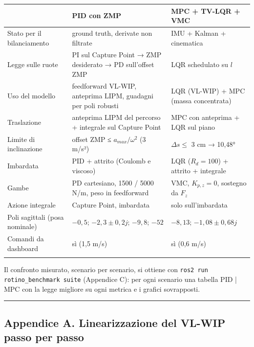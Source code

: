 \documentclass[
]{article}
\begin{document}
\begin{longtable}[]{@{}>{\raggedright\arraybackslash}p{}>{\raggedright\arraybackslash}p{}>{\raggedright\arraybackslash}p{}@{}}
\toprule\noalign{}
 & PID con ZMP & MPC + TV-LQR + VMC \\
\midrule\noalign{}
\endhead
Stato per il bilanciamento & ground truth, derivate non filtrate & IMU + Kalman + cinematica \\
Legge sulle ruote & PI sul Capture Point → ZMP desiderato → PD sull'offset ZMP & LQR schedulato su \(l\) \\
Uso del modello & feedforward VL-WIP, anteprima LIPM, guadagni per poli robusti & LQR (VL-WIP) + MPC (massa concentrata) \\
Traslazione & anteprima LIPM del percorso + integrale sul Capture Point & MPC con anteprima + LQR sul piano \\
Limite di inclinazione & offset ZMP ≤ \(a_{max}/\omega^2\) (3 m/s²) & \(\Delta s\le\) 3 cm → 10,48° \\
Imbardata & PID + attrito (Coulomb e viscoso) & LQR (\(R_d = 100\)) + attrito + integrale \\
Gambe & PD cartesiano, 1500 / 5000 N/m, peso in feedforward & VMC, \(K_{p,z} = 0\), sostegno da \(F_z\) \\
Azione integrale & Capture Point, imbardata & solo sull'imbardata \\
Poli sagittali (posa nominale) & \(-0{,}5\); \(-2{,}3\pm0{,}2j\); \(-9{,}8\); \(-52\) & \(-8{,}13\); \(-1{,}08\pm0{,}68j\) \\
Comandi da dashboard & sì (1,5 m/s) & sì (0,6 m/s) \\
\bottomrule\noalign{}
\end{longtable}

Il confronto misurato, scenario per scenario, si ottiene con \texttt{ros2 run rotino\_benchmark suite} (Appendice C): per ogni scenario una tabella PID | MPC con la legge migliore su ogni metrica e i grafici sovrapposti.

\begin{center}\rule{0.5\linewidth}{0.5pt}\end{center}

\subsection{Appendice A. Linearizzazione del VL-WIP passo per passo}\label{appendice-a-linearizzazione-del-vl-wip-passo-per-passo}
\end{document}
